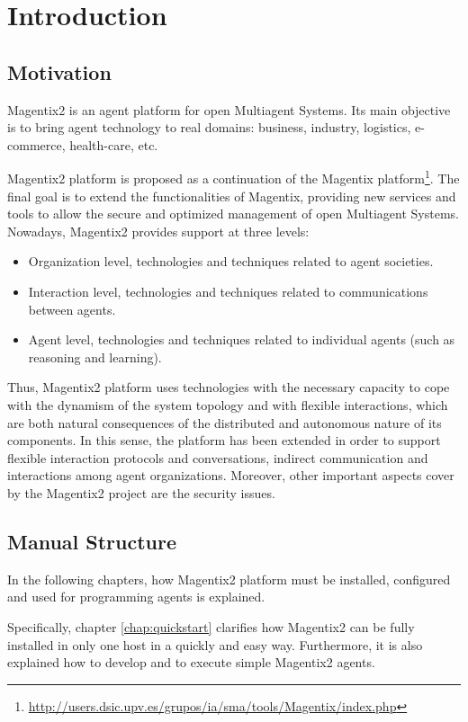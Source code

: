 \chapter{Introduction}
\section{Motivation}
Magentix2 is an agent platform for open Multiagent Systems. Its main objective is to bring agent technology to real domains: business, industry, logistics, e-commerce, health-care, etc.

Magentix2 platform is proposed as a continuation of the Magentix platform\footnote{\url{http://users.dsic.upv.es/grupos/ia/sma/tools/Magentix/index.php}}. The final goal is to extend the functionalities of Magentix, providing new services and tools to allow the secure and optimized management of open Multiagent Systems. Nowadays, Magentix2 provides support at three levels: 

\begin{itemize}
	\item Organization level, technologies and techniques related to agent societies.
  \item Interaction level, technologies and techniques related to communications between agents.
 \item Agent level, technologies and techniques related to individual agents (such as reasoning and learning).
\end{itemize}

Thus, Magentix2 platform uses technologies with the necessary capacity  to cope with the  dynamism of the system topology and with flexible interactions, which are both natural consequences of the distributed and autonomous nature of its components. In this sense, the platform has been extended in order to support flexible interaction protocols and conversations, indirect communication and interactions among agent organizations. Moreover, other important aspects cover by the Magentix2 project are the security issues.

 


\section{Manual Structure}

In the following chapters, how Magentix2 platform must be installed, configured and used for programming agents is explained. 

Specifically, chapter \ref{chap:quickstart} clarifies how Magentix2 can be fully installed in only one host in a quickly and easy way. Furthermore, it is also explained how to develop and to execute simple Magentix2 agents. 

